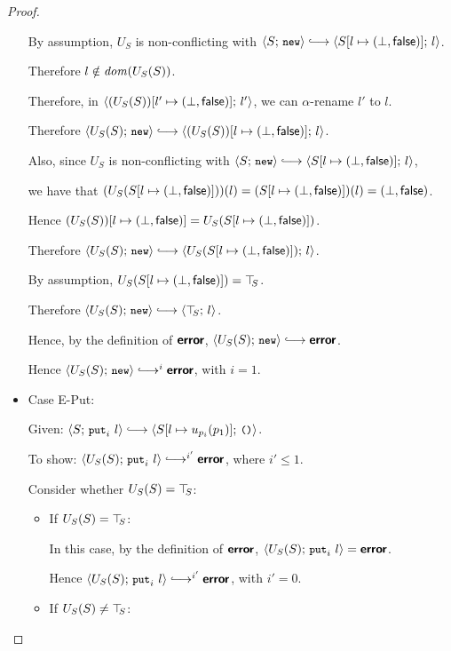 \begin{proof}
\begin{itemize}
    By assumption, $U_S$ is non-conflicting with $\config{S}{\NEW}
    \parstepsto \config{\extS{S}{l}{\bot}{\frozenfalse}}{l}$.

    Therefore $l \notin \mathit{dom}(U_S(S))$.

    Therefore, in
    $\langle (U_S(S))[l' \mapsto (\bot, \textsf{false})];\, l' \rangle$, we
    can $\alpha$-rename $l'$ to $l$.

    Therefore $\config{U_S(S)}{\NEW} \parstepsto
    \config{\extS{(U_S(S))}{l}{\bot}{\frozenfalse}}{l}$.

    Also, since $U_S$ is non-conflicting with $\config{S}{\NEW}
    \parstepsto \config{\extS{S}{l}{\bot}{\frozenfalse}}{l}$,

    we have that $(U_S(S[l \mapsto (\bot, \textsf{false})]))(l) =
    (S[l \mapsto (\bot, \textsf{false})])(l) =
    (\bot, \textsf{false})$.

    Hence $(U_S(S))[l \mapsto (\bot, \textsf{false})] =
    U_S(S[l \mapsto (\bot, \textsf{false})])$.

    Therefore $\config{U_S(S)}{\NEW} \parstepsto
    \config{U_S(\extS{S}{l}{\bot}{\frozenfalse})}{l}$.

    By assumption, $U_S(S[l \mapsto (\bot, \textsf{false})]) = \top\hspace{-0.85mm}_{S}$.

    Therefore $\config{U_S(S)}{\NEW} \parstepsto \config{\topS}{l}$.

    Hence, by the definition of $\textbf{\textsf{error}}$, $\config{U_S(S)}{\NEW}
    \parstepsto \error$.

    Hence $\config{U_S(S)}{\NEW} \parstepsto^i \error$, with $i = 1$.

  \item Case {\sc E-Put}:

    Given: $\config{S}{\putiexp{l}} \parstepsto
    \config{\extSRaw{S}{l}{u_{p_i}(p_1)}}{\unit}$.

    To show: $\config{U_S(S)}{\putiexp{l}} \parstepsto^{i'} \error$,
    where $i' \leq 1$.

    Consider whether $U_S(S) = \top\hspace{-0.85mm}_{S}$:
    \begin{itemize}

    \item If $U_S(S) = \top\hspace{-0.85mm}_{S}$:

      In this case, by the definition of $\textbf{\textsf{error}}$,
      $\langle U_S(S);\, \mbox{\small{\texttt{put}}}_i~l \rangle = \textbf{\textsf{error}}$.

      Hence $\config{U_S(S)}{\putiexp{l}} \parstepsto^{i'} \error$,
      with $i' = 0$.

    \item If $U_S(S) \neq \top\hspace{-0.85mm}_{S}$:


\end{itemize}
\end{itemize}
\end{proof}

